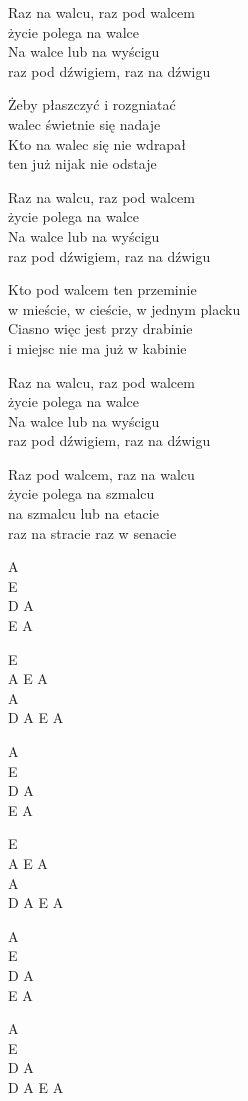 \begin{text}
Raz na walcu, raz pod walcem\\
życie polega na walce\\
Na walce lub na wyścigu\\
raz pod dźwigiem, raz na dźwigu

Żeby płaszczyć i rozgniatać\\
walec świetnie się nadaje\\
Kto na walec się nie wdrapał\\
ten już nijak nie odstaje

Raz na walcu, raz pod walcem\\
życie polega na walce\\
Na walce lub na wyścigu\\
raz pod dźwigiem, raz na dźwigu

Kto pod walcem ten przeminie\\
w mieście, w cieście, w jednym placku\\
Ciasno więc jest przy drabinie\\
i miejsc nie ma już w kabinie

Raz na walcu, raz pod walcem\\
życie polega na walce\\
Na walce lub na wyścigu\\
raz pod dźwigiem, raz na dźwigu

Raz pod walcem, raz na walcu\\
życie polega na szmalcu\\
na szmalcu lub na etacie\\
raz na stracie raz w senacie
\end{text}
\begin{chord}
A\\
E\\
D A\\
E A

E\\
A E A\\
A\\
D A E A

A\\
E\\
D A\\
E A

E\\
A E A\\
A\\
D A E A

A\\
E\\
D A\\
E A

A\\
E\\
D A\\
D A E A
\end{chord}
